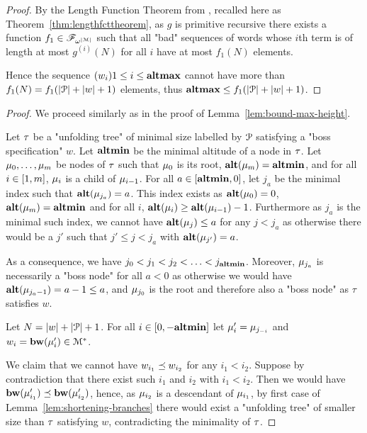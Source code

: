 \begin{proof}
	By the Length Function Theorem from \cite{SchmitzS2011upperHigman}, recalled here as Theorem~\ref{thm:lengthfcttheorem}, as $g$ is primitive recursive there exists a function $f_1 \in \mathscr{F}_{\omega^{|\mathcal{M}|}}$ such that all "bad" sequences of words whose $i$th term is of length at most $g^{(i)}(N)$ for all $i$ have at most $f_1(N)$ elements.
	
	Hence the sequence $(w_i){1\leq i \leq \mathbf{altmax}}$ cannot have more than $f_1(N) = f_1(|\mathcal{P}| + |w| + 1)$ elements, thus $\mathbf{altmax} \leq f_1(|\mathcal{P}| + |w| + 1)$.
\end{proof}

\lemBoundMinHeight*

\begin{proof}
	We proceed similarly as in the proof of Lemma~\ref{lem:bound-max-height}. 
	
	Let $\tau$ be a "unfolding tree" of minimal size labelled by $\mathcal{P}$ satisfying a "boss specification" $w$. Let $\mathbf{altmin}$ be the minimal altitude of a node in $\tau$. Let $\mu_0, \ldots, \mu_m$ be nodes of $\tau$ such that $\mu_0$ is its root, $\mathbf{alt}(\mu_m) = \mathbf{altmin}$, and for all $i\in [1,m]$, $\mu_i$ is a child of $\mu_{i-1}$.
	For all $a \in [\mathbf{altmin},0]$, let $j_a$ be the minimal index such that $\mathbf{alt}(\mu_{j_a}) = a$. This index exists as $\mathbf{alt}(\mu_0) = 0$, $\mathbf{alt}(\mu_m) = \mathbf{altmin}$ and for all $i$, $\mathbf{alt}(\mu_{i}) \geq \mathbf{alt}(\mu_{i-1})-1$.
	Furthermore as $j_a$ is the minimal such index, we cannot have $\mathbf{alt}(\mu_j) \leq a$ for any $j < j_a$ as otherwise there would be a $j'$ such that $j' \leq j < j_a$ with $\mathbf{alt}(\mu_{j'}) = a$.
	
	As a consequence, we have $j_0 < j_1 < j_2 < \ldots < j_{\mathbf{altmin}}$. Moreover, $\mu_{j_a}$ is necessarily a "boss node" for all $a<0$ as otherwise we would have $\mathbf{alt}(\mu_{j_a-1}) = a-1 \leq a$, and $\mu_{j_0}$ is the root and therefore also a "boss node" as $\tau$ satisfies $w$.
	
	Let $N = |w| + |\mathcal{P}|+1$. For all $i \in [0,-\mathbf{altmin}]$ let $\mu'_i = \mu_{j_{-i}}$ and $w_i = \mathbf{bw}(\mu'_{i}) \in \mathcal{M}^*$.
	
	We claim that we cannot have $w_{i_1}\preceq w_{i_2}$ for any  $i_1< i_2$.
	Suppose by contradiction that there exist such $i_1$ and $i_2$ with $i_1 < i_2$. Then we would have $\mathbf{bw}(\mu'_{i_1}) \preceq \mathbf{bw}(\mu'_{i_2})$, hence, as $\mu_{i_2}$ is a descendant of $\mu_{i_1}$, by first case of Lemma~\ref{lem:shortening-branches} there would exist a "unfolding tree" of smaller size than $\tau$ satisfying $w$, contradicting the minimality of $\tau$.
	

\end{proof}
